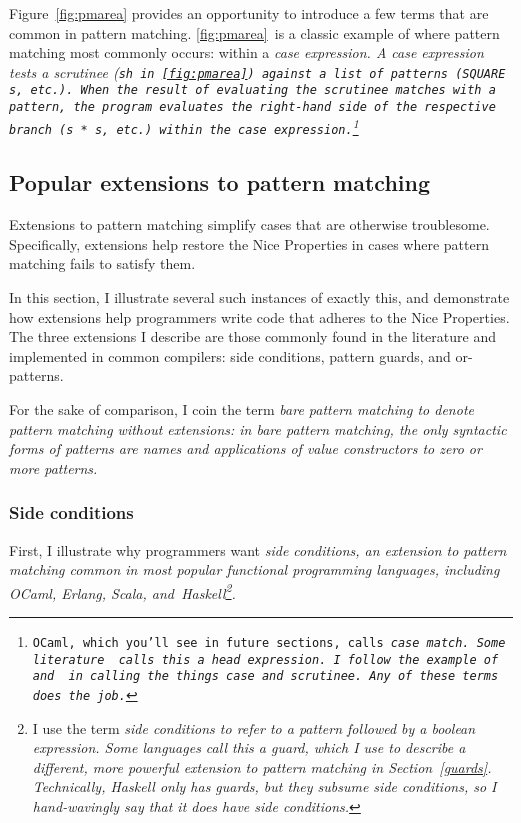 \documentclass[manuscript,screen,review, 12pt, nonacm]{acmart}
\begin{document}
    Figure~\ref{fig:pmarea} provides an opportunity to introduce a few terms
    that are common in pattern matching. \ref{fig:pmarea}~is a classic example
    of where pattern matching most commonly occurs: within a \it{case}
    expression. A \it{case} expression tests a \it{scrutinee} (\tt{sh}
    in~\ref{fig:pmarea}) against a list of patterns (\tt{SQUARE s}, etc.). When
    the result of evaluating the scrutinee matches with a pattern, the program
    evaluates the right-hand side of the respective branch (\tt{s * s}, etc.)
    within the \it{case} expression.\footnote{OCaml, which you'll see in future
    sections, calls \it{case} \tt{match}. Some literature~\citep{guardproposal}
    calls this a \it{head expression}. I follow the example of~\citet{bpc} and
    \citet{maranget} in calling the things \it{case} and \it{scrutinee}. Any of
    these terms does the job.} 

\subsection{Popular extensions to pattern matching}
\label{extensions}

    Extensions to pattern matching simplify cases that are otherwise
    troublesome. Specifically, extensions help restore the Nice Properties in
    cases where pattern matching fails to satisfy them. 
    
    In this section, I illustrate several such instances of exactly this, and
    demonstrate how extensions help programmers write code that adheres to the
    Nice Properties. The three extensions I describe are those commonly found in
    the literature and implemented in common compilers: side conditions, pattern
    guards, and or-patterns. 
    
    For the sake of comparison, I coin the term \it{bare pattern matching} to
    denote pattern matching \it{without} extensions: in bare pattern matching,
    the only syntactic forms of patterns are names and applications of value
    constructors to zero or more patterns. 



\subsubsection{Side conditions}

    First, I illustrate why programmers want \it{side conditions}, an extension
    to pattern matching common in most popular functional programming languages,
    including OCaml, Erlang, Scala, and~Haskell\footnote{I use the term \it{side
    conditions} to refer to a pattern followed by a boolean expression. Some
    languages call this a \it{guard}, which I use to describe a different, more
    powerful extension to pattern matching in Section~\ref{guards}.  
    Technically, Haskell \it{only} has guards, but they subsume side conditions,
    so I hand-wavingly say that it does have side conditions.}. 
    
\end{document}
